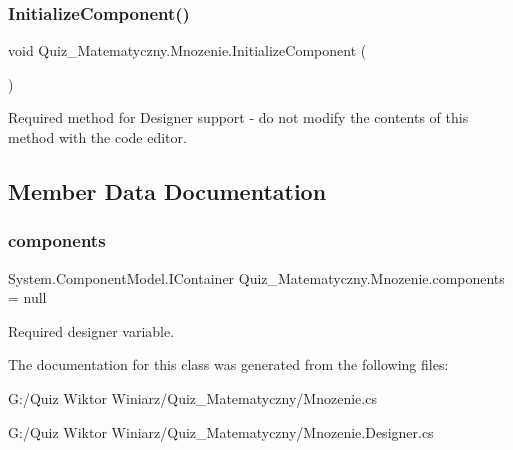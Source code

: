 \subsubsection{\texorpdfstring{InitializeComponent()}{InitializeComponent()}}
{\footnotesize\ttfamily void Quiz\+\_\+\+Matematyczny.\+Mnozenie.\+Initialize\+Component (\begin{DoxyParamCaption}{ }\end{DoxyParamCaption})\hspace{0.3cm}{\ttfamily [private]}}



Required method for Designer support -\/ do not modify the contents of this method with the code editor. 



\subsection{Member Data Documentation}
\mbox{\label{class_quiz___matematyczny_1_1_mnozenie_a4268b571f886b6a6d054c3812ddcdc9d}} 
\subsubsection{\texorpdfstring{components}{components}}
{\footnotesize\ttfamily System.\+Component\+Model.\+I\+Container Quiz\+\_\+\+Matematyczny.\+Mnozenie.\+components = null\hspace{0.3cm}{\ttfamily [private]}}



Required designer variable. 



The documentation for this class was generated from the following files\+:\begin{DoxyCompactItemize}
\item 
G\+:/\+Quiz Wiktor Winiarz/\+Quiz\+\_\+\+Matematyczny/Mnozenie.\+cs\item 
G\+:/\+Quiz Wiktor Winiarz/\+Quiz\+\_\+\+Matematyczny/Mnozenie.\+Designer.\+cs\end{DoxyCompactItemize}
